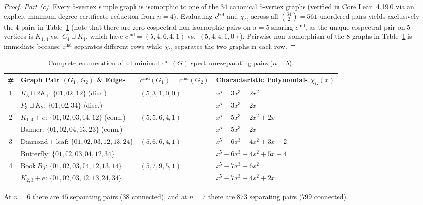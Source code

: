 \documentclass[11pt]{article}
\theoremstyle{definition}
\newcommand{\cind}{c^{\mathrm{ind}}}
\begin{document}
\begin{proof}
\emph{Part (c).} Every $5$-vertex simple graph is isomorphic to one of the $34$ canonical $5$-vertex graphs (verified in Core Lean~4.19.0 via an explicit minimum-degree certificate reduction from $n = 4$). Evaluating $\cind$ and $\chi_G$ across all $\binom{34}{2} = 561$ unordered pairs yields exclusively the $4$ pairs in Table~\ref{tab:n5-pairs} (note that there are zero cospectral non-isomorphic pairs on $n = 5$ sharing $\cind$, as the unique cospectral pair on $5$ vertices is $K_{1,4}$ vs.\ $C_4 \sqcup K_1$, which have $\cind = (5,4,6,4,1)$ vs.\ $(5,4,4,1,0)$). Pairwise non-isomorphism of the $8$ graphs in Table~\ref{tab:n5-pairs} is immediate because $\cind$ separates different rows while $\chi_G$ separates the two graphs in each row.
\end{proof}

\begin{table}[ht]
\centering
\small
\caption{Complete enumeration of all minimal $\cind(G)$ spectrum-separating pairs ($n = 5$).}
\label{tab:n5-pairs}
\begin{tabular}{@{}clll@{}}
\toprule
\textbf{\#} & \textbf{Graph Pair $(G_1,\, G_2)$ \& Edges} & $\cind(G_1) = \cind(G_2)$ & \textbf{Characteristic Polynomials $\chi_G(x)$} \\
\midrule
1 & $K_3 \sqcup 2K_1$: $\{01,02,12\}$ (disc.) & $(5, 3, 1, 0, 0)$ & $x^5 - 3x^3 - 2x^2$ \\
  & $P_3 \sqcup K_2$: $\{01,02,34\}$ (disc.) & & $x^5 - 3x^3 + 2x$ \\[3pt]
2 & $K_{1,4}+e$: $\{01,02,03,04,12\}$ (conn.) & $(5, 5, 6, 4, 1)$ & $x^5 - 5x^3 - 2x^2 + 2x$ \\
  & $\mathrm{Banner}$: $\{01,02,04,13,23\}$ (conn.) & & $x^5 - 5x^3 + 2x$ \\[3pt]
3 & $\mathrm{Diamond}+\text{leaf}$: $\{01,02,03,12,13,24\}$ & $(5, 6, 6, 4, 1)$ & $x^5 - 6x^3 - 4x^2 + 3x + 2$ \\
  & $\mathrm{Butterfly}$: $\{01,02,03,04,12,34\}$ & & $x^5 - 6x^3 - 4x^2 + 5x + 4$ \\[3pt]
4 & $\mathrm{Book}\ B_3$: $\{01,02,03,04,12,13,14\}$ & $(5, 7, 9, 5, 1)$ & $x^5 - 7x^3 - 6x^2$ \\
  & $K_{2,3}+e$: $\{01,02,03,12,13,24,34\}$ & & $x^5 - 7x^3 - 4x^2 + 2x$ \\
\bottomrule
\end{tabular}
\end{table}

At $n = 6$ there are $45$ separating pairs ($38$ connected), and at $n = 7$ there are $873$ separating pairs ($799$ connected).
\end{document}
